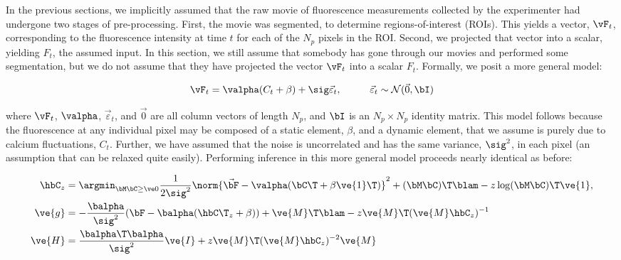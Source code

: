 In the previous sections, we implicitly assumed that the raw movie of fluorescence measurements collected by the experimenter had undergone two stages of pre-processing.  First, the movie was segmented, to determine regions-of-interest (ROIs).  This yields a vector, $\vF_t$, corresponding to the fluorescence intensity at time $t$ for each of the $N_p$ pixels in the ROI.  Second, we projected that vector into a scalar, yielding $F_t$, the assumed input.  In this section, we still assume that somebody has gone through our movies and performed some segmentation, but we do not assume that they have projected the vector $\vF_t$ into a scalar $F_t$.  Formally, we posit a more general model:

\begin{align} \label{eq:bF}
\vF_t &= \valpha (C_t + \beta) +  \sig \vec{\varepsilon}_t, \qquad &\vec{\varepsilon}_t \sim \mathcal{N}(\vec{0},\bI)   
\end{align}

\noindent where $\vF_t$, $\valpha$, $\vec{\varepsilon}_t$, and $\vec{0}$  are all column vectors of length $N_p$, and $\bI$ is an $N_p \times N_p$ identity matrix.  This model follows because the fluorescence at any individual pixel may be composed of a static element, $\beta$, and a dynamic element, that we assume is purely due to calcium fluctuations, $C_t$.  Further, we have assumed that the noise is uncorrelated and has the same variance, $\sig^2$, in each pixel (an assumption that can be relaxed quite easily).  Performing inference in this more general model proceeds nearly identical as before:

\begin{align} 
\hbC_{\zzz} 
&= \az  \frac{1}{2 \sig^2} \norm{\vec{\bF} - \valpha (\bC\T +\beta\ve{1}\T)}^2 + (\bM \bC )\T \blam  - \zzz \log(\bM \bC)\T\ve{1},  \label{eq:eta4}\\
\ve{g} &= -\frac{\balpha}{\sig^2}(\bF -\balpha({\hbC\T}_{\zzz} + \beta)) + \ve{M}\T\blam - \zzz \ve{M}\T (\ve{M} \hbC_{\zzz})^{-1} \label{eq:g2} \\
\ve{H} &= \frac{\balpha\T \balpha}{\sig^2} \ve{I} + \zzz \ve{M}\T (\ve{M} \hbC_{\zzz})^{-2} \ve{M} \label{eq:H2}
\end{align}

